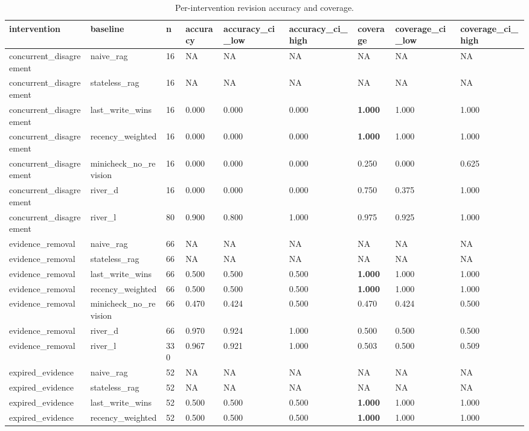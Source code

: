\begin{table}
\centering
\caption{Per-intervention revision accuracy and coverage.}
\begin{tabular}{lllllllll}
intervention & baseline & n & accuracy & accuracy\_ci\_low & accuracy\_ci\_high & coverage & coverage\_ci\_low & coverage\_ci\_high \\ \hline
concurrent\_disagreement & naive\_rag & 16 & NA & NA & NA & NA & NA & NA \\
concurrent\_disagreement & stateless\_rag & 16 & NA & NA & NA & NA & NA & NA \\
concurrent\_disagreement & last\_write\_wins & 16 & 0.000 & 0.000 & 0.000 & \textbf{1.000} & 1.000 & 1.000 \\
concurrent\_disagreement & recency\_weighted & 16 & 0.000 & 0.000 & 0.000 & \textbf{1.000} & 1.000 & 1.000 \\
concurrent\_disagreement & minicheck\_no\_revision & 16 & 0.000 & 0.000 & 0.000 & 0.250 & 0.000 & 0.625 \\
concurrent\_disagreement & river\_d & 16 & 0.000 & 0.000 & 0.000 & 0.750 & 0.375 & 1.000 \\
concurrent\_disagreement & river\_l & 80 & 0.900 & 0.800 & 1.000 & 0.975 & 0.925 & 1.000 \\
evidence\_removal & naive\_rag & 66 & NA & NA & NA & NA & NA & NA \\
evidence\_removal & stateless\_rag & 66 & NA & NA & NA & NA & NA & NA \\
evidence\_removal & last\_write\_wins & 66 & 0.500 & 0.500 & 0.500 & \textbf{1.000} & 1.000 & 1.000 \\
evidence\_removal & recency\_weighted & 66 & 0.500 & 0.500 & 0.500 & \textbf{1.000} & 1.000 & 1.000 \\
evidence\_removal & minicheck\_no\_revision & 66 & 0.470 & 0.424 & 0.500 & 0.470 & 0.424 & 0.500 \\
evidence\_removal & river\_d & 66 & 0.970 & 0.924 & 1.000 & 0.500 & 0.500 & 0.500 \\
evidence\_removal & river\_l & 330 & 0.967 & 0.921 & 1.000 & 0.503 & 0.500 & 0.509 \\
expired\_evidence & naive\_rag & 52 & NA & NA & NA & NA & NA & NA \\
expired\_evidence & stateless\_rag & 52 & NA & NA & NA & NA & NA & NA \\
expired\_evidence & last\_write\_wins & 52 & 0.500 & 0.500 & 0.500 & \textbf{1.000} & 1.000 & 1.000 \\
expired\_evidence & recency\_weighted & 52 & 0.500 & 0.500 & 0.500 & \textbf{1.000} & 1.000 & 1.000 \\

\end{tabular}
\end{table}

